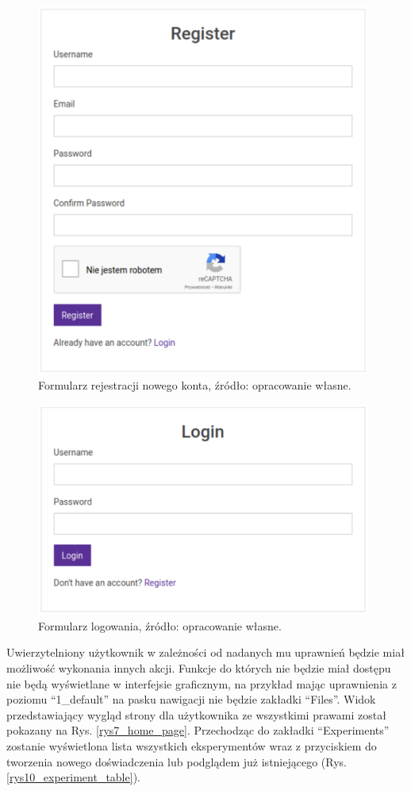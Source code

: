 \begin{figure}[htb]
	\centering
	\includegraphics[width=11cm]{grafika/registery_form.eps}
	\caption{Formularz rejestracji nowego konta, źródło: opracowanie własne.}
	\label{rys8_registery_form}
\end{figure}

\begin{figure}[htb]
	\centering
	\includegraphics[width=11cm]{grafika/login_form.eps}
	\caption{Formularz logowania, źródło: opracowanie własne.}
	\label{rys9_login_form}
\end{figure}

Uwierzytelniony użytkownik w zależności od nadanych mu uprawnień będzie miał możliwość wykonania innych akcji. Funkcje do których nie będzie miał dostępu nie będą wyświetlane w interfejsie graficznym, na przykład mając uprawnienia z poziomu \enquote{1\_default} na pasku nawigacji nie będzie zakładki \enquote{Files}. Widok przedstawiający wygląd strony dla użytkownika ze wszystkimi prawami został pokazany na Rys. \ref{rys7_home_page}. Przechodząc do zakładki \enquote{Experiments} zostanie wyświetlona lista wszystkich eksperymentów wraz z przyciskiem do tworzenia nowego doświadczenia lub podglądem już istniejącego (Rys. \ref{rys10_experiment_table}). 


